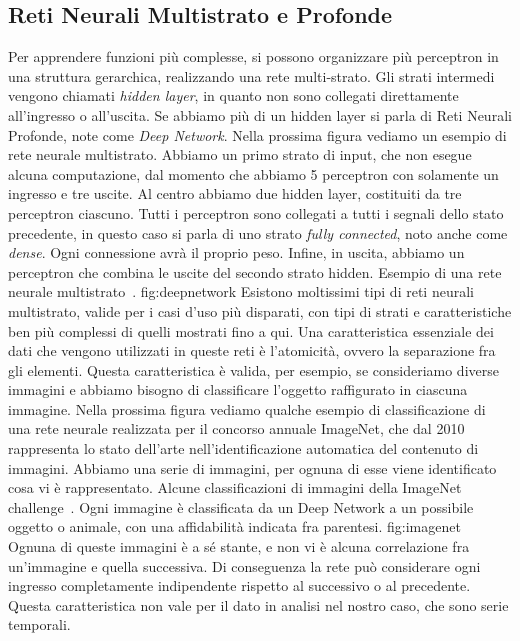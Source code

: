 \subsection{Reti Neurali Multistrato e Profonde}
Per apprendere funzioni più complesse, si possono organizzare più perceptron in una struttura gerarchica, realizzando una rete multi-strato. Gli strati intermedi vengono chiamati \textit{hidden layer}, in quanto non sono collegati direttamente all’ingresso o all’uscita. Se abbiamo più di un hidden layer si parla di Reti Neurali Profonde, note come \textit{Deep Network}. 
Nella prossima figura vediamo un esempio di rete neurale multistrato. Abbiamo un primo strato di input, che non esegue alcuna computazione, dal momento che abbiamo 5 perceptron con solamente un ingresso e tre uscite. Al centro abbiamo due hidden layer, costituiti da tre perceptron ciascuno. Tutti i perceptron sono collegati a tutti i segnali dello stato precedente, in questo caso si parla di uno strato \textit{fully connected}, noto anche come \textit{dense}. Ogni connessione avrà il proprio peso. Infine, in uscita, abbiamo un perceptron che combina le uscite del secondo strato hidden.
{Esempio di una rete neurale multistrato~\cite{aggarwal}.}
{fig:deepnetwork}
Esistono moltissimi tipi di reti neurali multistrato, valide per i casi d’uso più disparati, con tipi di strati e caratteristiche ben più complessi di quelli mostrati fino a qui. Una caratteristica essenziale dei dati che vengono utilizzati in queste reti è l’atomicità, ovvero la separazione fra gli elementi. Questa caratteristica è valida, per esempio, se consideriamo diverse immagini e abbiamo bisogno di classificare l’oggetto raffigurato in ciascuna immagine. Nella prossima figura vediamo qualche esempio di classificazione di una rete neurale realizzata per il concorso annuale ImageNet, che dal 2010 rappresenta lo stato dell’arte nell’identificazione automatica del contenuto di immagini. Abbiamo una serie di immagini, per ognuna di esse viene identificato cosa vi è rappresentato.
{Alcune classificazioni di immagini della ImageNet challenge~\cite{imagenet}. Ogni immagine è classificata da un Deep Network a un possibile oggetto o animale, con una affidabilità indicata fra parentesi.}
{fig:imagenet}
Ognuna di queste immagini è a sé stante, e non vi è alcuna correlazione fra un’immagine e quella successiva. Di conseguenza la rete può considerare ogni ingresso completamente indipendente rispetto al successivo o al precedente. Questa caratteristica non vale per il dato in analisi nel nostro caso, che sono serie temporali.

